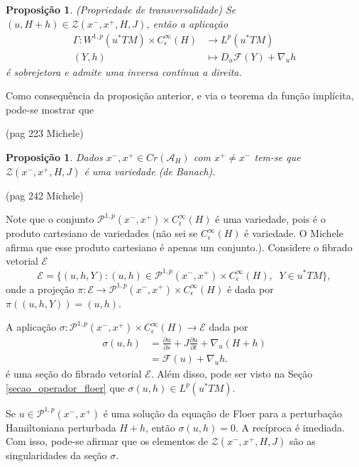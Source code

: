 \documentclass[12pt]{book}
\newtheorem{proposicao}[teorema]{Proposição}
\newcommand{\caminhosexponenciaisconectantes}[2]{\mathcal{P}^{1,p}(#1, #2)}
\newcommand{\caminhosexponenciaisconectantespadrao}{\caminhosexponenciaisconectantes{x^{-}}{x^{+}}}
\newcommand{\diferencialfloerponto}[1]{D_{#1}\operadorFloer}
\newcommand{\derivadaparcial}[2]{\frac{\partial #1}{\partial #2}}
\newcommand{\espacoLp}[1]{L^{p}(#1)}
\newcommand{\espacosobolev}[1]{W^{1,p}(#1)}
\newcommand{\funcionalH}{\mathcal{A}_{H}}
\newcommand{\operadorFloer}{\mathcal{F}}
\newcommand{\orbitasConectantesZ}{\mathcal{Z}(x^{-}, x^{+},H, J)}
\newcommand{\perturbacaoHamiltoniana}[1]{C^{\infty}_{\epsilon}(#1)}
\newcommand{\pontoscriticos}[1]{\textit{Cr}(#1)}
\newcommand{\pullbackfibradotangente}[2]{#1^{*}T#2}
\newcommand{\pullbackfibradotangenteM}[1]{\pullbackfibradotangente{#1}{M}}
\newcommand{\aviso}[1]{{\color{violet}(#1)}}
\newcommand{\alerta}[1]{{\color{red}#1}}
\begin{document}
	\begin{proposicao}\label{proposicao_gamma_sobrejetora}
		(Propriedade de transversalidade) Se $(u, H+h) \in \orbitasConectantesZ$, então a aplicação 
		$$
		\begin{aligned}
		\Gamma:\espacosobolev{\pullbackfibradotangenteM{u}}\times \perturbacaoHamiltoniana{H} 
		&\to \espacoLp{\pullbackfibradotangenteM{u}}
		\\
		(Y, h) 
		&\mapsto \diferencialfloerponto{u}(Y) + \nabla_{u}h
		\end{aligned}
		$$
		é sobrejetora e admite uma inversa contínua a direita.
	\end{proposicao}
	
	Como consequência da proposição anterior, e via o teorema da função implícita, pode-se mostrar que
	
	\aviso{pag 223 Michele}
	
	\begin{proposicao}
		Dados $x^{-},x^{+}\in \pontoscriticos{\funcionalH}$ com $x^{+}\neq  x^{-}$ tem-se que $\orbitasConectantesZ$ é uma variedade (de Banach). 
	\end{proposicao}
	
	\aviso{pag 242 Michele}
	
	Note que o conjunto $\caminhosexponenciaisconectantespadrao\times \perturbacaoHamiltoniana{H}$ é uma variedade, pois é o produto cartesiano de variedades \alerta{(não sei se $\perturbacaoHamiltoniana{H}$ é variedade. O Michele afirma que esse produto cartesiano é apenas um conjunto.)}. Considere o fibrado vetorial $\mathcal{E} $
	$$
	\mathcal{E} = \{(u, h, Y): (u, h)\in \caminhosexponenciaisconectantespadrao\times \perturbacaoHamiltoniana{H},\;\;Y\in \pullbackfibradotangenteM{u}\},
	$$
	onde a projeção $\pi:\mathcal{E}\to \caminhosexponenciaisconectantespadrao\times \perturbacaoHamiltoniana{H}$ é dada por $\pi((u, h, Y)) = (u, h)$.
	
	A aplicação $\sigma:\caminhosexponenciaisconectantespadrao\times \perturbacaoHamiltoniana{H}\to \mathcal{E}$ dada por 
	$$
	\begin{aligned}
	\sigma(u,h) &=\derivadaparcial{u}{s}+J\derivadaparcial{u}{t}+\nabla_{u}(H+h)\\
	&= \operadorFloer(u) +\nabla_{u}h.
	\end{aligned}
	$$
	é uma seção do fibrado vetorial $\mathcal{E}$. Além disso, pode ser visto na Seção \ref{secao_operador_floer} que $\sigma(u,h)\in \espacoLp{\pullbackfibradotangenteM{u}}$.
	
	Se $u \in \caminhosexponenciaisconectantespadrao$ é uma solução da equação de Floer para a perturbação Hamiltoniana perturbada $H+h$, então $\sigma(u, h) = 0$. A recíproca é imediada. Com isso, pode-se afirmar que os elementos de $\orbitasConectantesZ$ são as singularidades da seção $\sigma$. 
	
\end{document}
